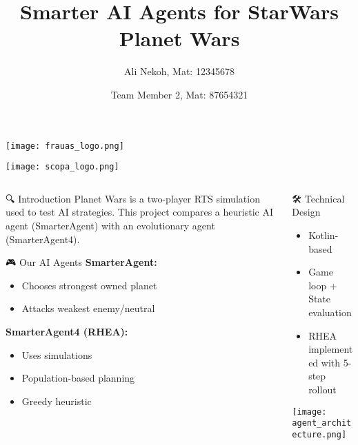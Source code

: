 \documentclass[final]{beamer}
\title{Smarter AI Agents for StarWars Planet Wars}
\author{Ali Nekoh, Mat: 12345678 \and Team Member 2, Mat: 87654321}
\institute{Frankfurt University of Applied Sciences}
\begin{document}
\begin{frame}[t]

  \begin{minipage}{0.15\linewidth}
    \texttt{[image: frauas\_logo.png]}
  \end{minipage}
  \hfill
  \begin{minipage}{0.15\linewidth}
    \texttt{[image: scopa\_logo.png]}
  \end{minipage}

  \begin{center}
    \maketitle
  \end{center}

  \begin{columns}[t]
    \begin{column}{0.32\linewidth}
      \begin{block}{🔍 Introduction}
        Planet Wars is a two-player RTS simulation used to test AI strategies. This project compares a heuristic AI agent (SmarterAgent) with an evolutionary agent (SmarterAgent4).
      \end{block}

      \begin{block}{🎮 Our AI Agents}
        \textbf{SmarterAgent:}
        \begin{itemize}
          \item Chooses strongest owned planet
          \item Attacks weakest enemy/neutral
        \end{itemize}
        \textbf{SmarterAgent4 (RHEA):}
        \begin{itemize}
          \item Uses simulations
          \item Population-based planning
          \item Greedy heuristic
        \end{itemize}
      \end{block}
    \end{column}

    \begin{column}{0.32\linewidth}
      \begin{block}{🛠 Technical Design}
        \begin{itemize}
          \item Kotlin-based
          \item Game loop + State evaluation
          \item RHEA implemented with 5-step rollout
        \end{itemize}
        \texttt{[image: agent\_architecture.png]}
      \end{block}


\end{column}
\end{columns}
\end{frame}
\end{document}
